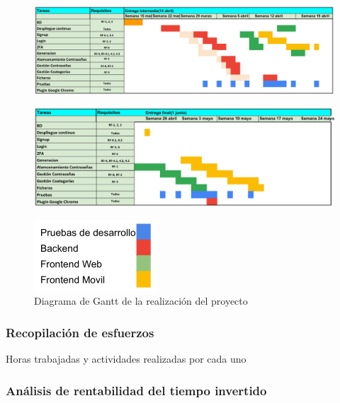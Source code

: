 \documentclass{article}
\begin{document}
\begin{landscape}
   \begin{figure}[H]
       \centering
       \includegraphics[width=1.2\textheight]{../images/diag-gantt-1-nuevo.png}
       \label{gantt-1-n}
   \end{figure}
  
   \begin{figure}[H]
       \centering
       \includegraphics[width=1\textheight]{../images/diag-gantt-2-nuevo.png}
       \label{gantt-2-n}
      \end{figure}
      
      \begin{figure}[H]
         \centering
         \includegraphics[width=0.2\textheight]{../images/diag-gantt-3-nuevo.png}
         \caption{Diagrama de Gantt de la realización del proyecto}
         \label{gantt-3-n}
  \end{figure}
\end{landscape}
\pagebreak

\subsubsection*{Recopilación de esfuerzos}

Horas trabajadas y actividades realizadas por cada uno

\subsubsection*{Análisis de rentabilidad del tiempo invertido}
\end{document}
